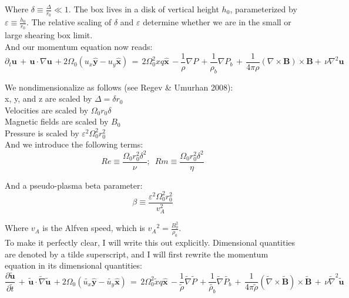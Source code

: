 \documentclass[letterpaper,12pt]{article}
\newcommand\reye{\mathrel{Re}}
\newcommand\reym{\mathrel{Rm}}
\begin{document}
Where $\delta \equiv \frac{\Delta}{r_0} \ll 1 $. The box lives in a disk of vertical height $h_0$, parameterized by $\varepsilon \equiv \frac{h_0}{r_0}$. The relative scaling of $\delta$ and $\varepsilon$ determine whether we are in the small or large shearing box limit.\\

And our momentum equation now reads: 
\[\partial_t \mathbf{u} \, + \, \mathbf{u} \cdot \nabla \mathbf{u} \, + 2\Omega_0\left(u_x \mathbf{\hat{y}} - u_{y}\mathbf{\hat{x}}\right) \, = \, 2\Omega_0^2 x q \mathbf{\hat{x}} \, -\frac{1}{\rho}\nabla P \, +\frac{1}{\rho_b}\nabla P_b \,  + \, \frac{1}{4 \pi \rho} \left( \nabla \times \mathbf{B} \right) \times \mathbf{B} + \, \nu\nabla^2 \mathbf{u} \,\]

\noindent We nondimensionalize as follows (see Regev \& Umurhan 2008): \\

\noindent x, y, and z are scaled by $\Delta = \delta r_0$ \\
Velocities are scaled by $\Omega_0 r_0 \delta$ \\
Magnetic fields are scaled by $B_0$ \\
Pressure is scaled by $\varepsilon^2 \Omega_0^2 r_0^2$ \\ 

And we introduce the following terms:
\[\reye \equiv \frac{\Omega_0 r_0^2 \delta^2}{\nu} ; \, \, \, \reym \equiv \frac{\Omega_0 r_0^2 \delta^2}{\eta}\]

And a pseudo-plasma beta parameter: 
\[\beta \equiv \frac{\varepsilon^2\Omega_0^2r_0^2}{v_A^2} \]

Where $v_A$ is the Alfven speed, which is ${v_A}^2 = \frac{B_0^2}{\rho_0}$. \\

To make it perfectly clear, I will write this out explicitly. Dimensional quantities are denoted by a tilde superscript, and I will first rewrite the momentum equation in its dimensional quantities: \\

\[\frac{\partial \mathbf{\widetilde{u}}}{\partial \widetilde{t}} \, + \, \mathbf{\widetilde{u}} \cdot \widetilde{\nabla} \mathbf{\widetilde{u}} \, + 2\Omega_0\left(\widetilde{u_x} \mathbf{\hat{y}} - \widetilde{u_{y}}\mathbf{\hat{x}}\right) \, = \, 2\Omega_0^2 \widetilde{x} q \mathbf{\hat{x}} \, -\frac{1}{\widetilde{\rho}}\widetilde{\nabla} \widetilde{P} \, +\frac{1}{\widetilde{\rho_b}}\widetilde{\nabla} \widetilde{P_b} \,  + \, \frac{1}{4 \pi \widetilde{\rho}} \left( \widetilde{\nabla} \times \mathbf{\widetilde{B}} \right) \times \mathbf{\widetilde{B}}  \, + \, \nu \widetilde{\nabla}^2 \mathbf{\widetilde{u}} \,\]
\end{document}
